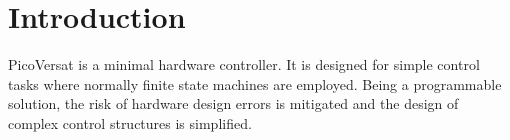 \section{Introduction}

PicoVersat is a minimal hardware controller. It is designed for simple control
tasks where normally finite state machines are employed. Being a programmable
solution, the risk of hardware design errors is mitigated and the design of
complex control structures is simplified.


